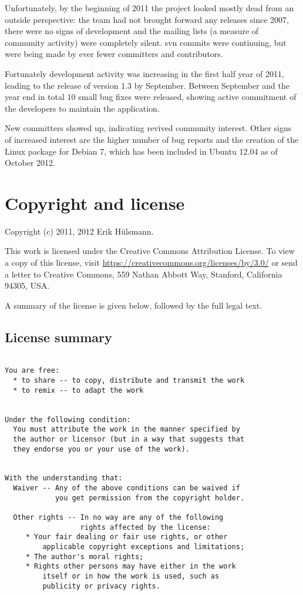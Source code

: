 Unfortunately, by the beginning of 2011 the project looked mostly dead from
an outside perspective: the team had not brought forward any releases since
2007, there were no signs of development and the mailing lists (a measure
of community activity) were
completely silent.  \gls{svn} commits were continuing, but were being made by
ever fewer committers and contributors.

Fortunately development activity was increasing in the first half year of 2011,
leading to the release of version 1.3 by September.  Between September and the
year end in total 10 small bug fixes were released, showing active commitment
of the developers to maintain the application.

New committers showed up, indicating revived community interest. Other signs of
increased interest are the higher number of bug reports and the creation of the
Linux package for Debian 7, which has been included in Ubuntu 12.04 as of
October 2012.



\chapter{Copyright and license}
\label{app-copyright-license}

Copyright (c) 2011, 2012 Erik H\"ulsmann.


This work is licensed under the Creative Commons Attribution License.
To view a copy of this license, visit \url{https://creativecommons.org/licenses/by/3.0/}
or send a letter to Creative Commons, 559 Nathan Abbott Way,
Stanford, California 94305, USA.

A summary of the license is given below, followed by the full legal text.

\section{License summary}
\label{sec-license-summary}

\begin{verbatim}

You are free:
  * to share -- to copy, distribute and transmit the work
  * to remix -- to adapt the work


Under the following condition:
  You must attribute the work in the manner specified by
  the author or licensor (but in a way that suggests that
  they endorse you or your use of the work).


With the understanding that:
  Waiver -- Any of the above conditions can be waived if
            you get permission from the copyright holder.
  
  Other rights -- In no way are any of the following
                  rights affected by the license:
     * Your fair dealing or fair use rights, or other
         applicable copyright exceptions and limitations;
     * The author's moral rights;
     * Rights other persons may have either in the work
         itself or in how the work is used, such as
         publicity or privacy rights.

\end{verbatim}



